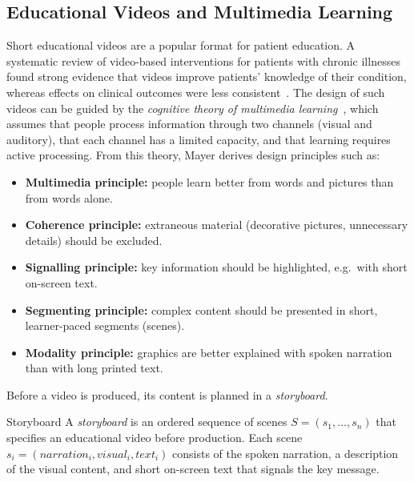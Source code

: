 \subsection{Educational Videos and Multimedia Learning}
\label{sec:bg-video}

Short educational videos are a popular format for patient education. A
systematic review of video-based interventions for patients with chronic
illnesses found strong evidence that videos improve patients' knowledge of
their condition, whereas effects on clinical outcomes were less
consistent~\cite{deshpande2023video}. The design of such videos can be
guided by the \emph{cognitive theory of multimedia learning}~\cite{mayer2020multimedia},
which assumes that people process information through two channels (visual
and auditory), that each channel has a limited capacity, and that learning
requires active processing. From this theory, Mayer derives design principles
such as:
\begin{itemize}
  \item \textbf{Multimedia principle:} people learn better from words and
        pictures than from words alone.
  \item \textbf{Coherence principle:} extraneous material (decorative
        pictures, unnecessary details) should be excluded.
  \item \textbf{Signalling principle:} key information should be highlighted,
        e.g.\ with short on-screen text.
  \item \textbf{Segmenting principle:} complex content should be presented in
        short, learner-paced segments (scenes).
  \item \textbf{Modality principle:} graphics are better explained with spoken
        narration than with long printed text.
\end{itemize}

Before a video is produced, its content is planned in a \emph{storyboard}.

\begin{bgdefinition}{Storyboard}
A \emph{storyboard} is an ordered sequence of scenes $S = (s_1, \dots, s_n)$
that specifies an educational video before production. Each scene
$s_i = (\mathit{narration}_i, \mathit{visual}_i, \mathit{text}_i)$ consists of
the spoken narration, a description of the visual content, and short
on-screen text that signals the key message.
\end{bgdefinition}

